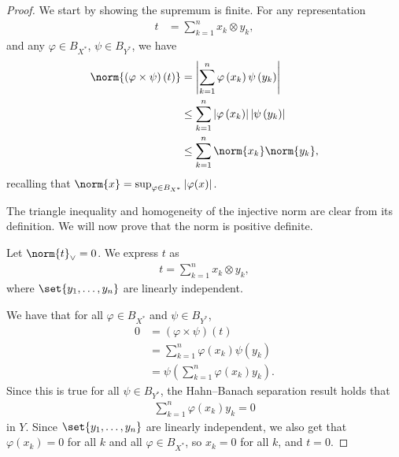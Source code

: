 \documentclass[10pt]{mypackage}
\begin{document}
\begin{proof}
  We start by showing the supremum is finite. For any representation
  \begin{align*}
    t &= \sum_{k=1}^{n}x_k\otimes y_k,
  \end{align*}
  and any $\varphi\in B_{X^{\ast}}$, $\psi\in B_{Y^{\ast}}$, we have
  \begin{align*}
    \norm{\left(\varphi\times\psi\right)\left(t\right)} &= \left\vert \sum_{k=1}^{n}\varphi\left(x_k\right)\psi\left(y_k\right) \right\vert\\
                                                        &\leq \sum_{k=1}^{n}\left\vert \varphi\left(x_k\right) \right\vert\left\vert \psi\left(y_k\right) \right\vert\\
                                                        &\leq \sum_{k=1}^{n}\norm{x_k}\norm{y_k},
  \end{align*}
  recalling that $\norm{x} = \sup_{\varphi\in B_{X^{\ast}}}\left\vert \varphi(x) \right\vert$.\newline

  The triangle inequality and homogeneity of the injective norm are clear from its definition. We will now prove that the norm is positive definite.\newline

  Let $\norm{t}_{\vee} = 0$. We express $t$ as
  \begin{align*}
    t = \sum_{k=1}^{n}x_k\otimes y_k,
  \end{align*}
  where $\set{y_1,\dots,y_n}$ are linearly independent.\newline

  We have that for all $\varphi\in B_{X^{\ast}}$ and $\psi\in B_{Y^{\ast}}$,
  \begin{align*}
    0 &= \left(\varphi\times\psi\right)\left(t\right)\\
      &= \sum_{k=1}^{n}\varphi\left(x_k\right)\psi\left(y_k\right)\\
      &= \psi\left(\sum_{k=1}^{n}\varphi\left(x_k\right)y_k\right).
  \end{align*}
  Since this is true for all $\psi\in B_{Y^{\ast}}$, the Hahn--Banach separation result holds that
  \begin{align*}
    \sum_{k=1}^{n}\varphi\left(x_k\right)y_k = 0
  \end{align*}
  in $Y$. Since $\set{y_1,\dots,y_n}$ are linearly independent, we also get that $\varphi\left(x_k\right) = 0$ for all $k$ and all $\varphi\in B_{X^{\ast}}$, so $x_k = 0$ for all $k$, and $t = 0$.\newline


\end{proof}
\end{document}

